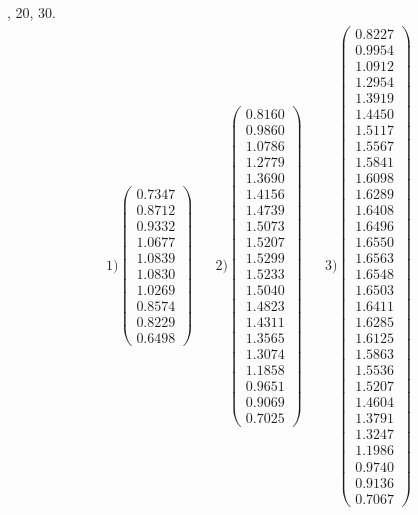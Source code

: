 \documentclass{udpreport}
\begin{document}
\begin{enumerate}
\begin {enumerate}
, 20, 30.
 	        \begin{align*}
 	             1) \left(\begin{array}{c} 0.7347\\ 0.8712\\ 0.9332\\ 1.0677\\ 1.0839\\ 1.0830\\ 1.0269\\ 0.8574\\ 0.8229\\ 0.6498 \end{array}\right) 	 &&   2) \left(\begin{array}{c} 0.8160\\ 0.9860\\ 1.0786\\ 1.2779\\ 1.3690\\ 1.4156\\ 1.4739\\ 1.5073\\ 1.5207\\ 1.5299\\ 1.5233\\ 1.5040\\ 1.4823\\ 1.4311\\ 1.3565\\ 1.3074\\ 1.1858\\ 0.9651\\ 0.9069\\ 0.7025 \end{array}\right)   &&  3) \left(\begin{array}{c} 0.8227\\ 0.9954\\ 1.0912\\ 1.2954\\ 1.3919\\ 1.4450\\ 1.5117\\ 1.5567\\ 1.5841\\ 1.6098\\ 1.6289\\ 1.6408\\ 1.6496\\ 1.6550\\ 1.6563\\ 1.6548\\ 1.6503\\ 1.6411\\ 1.6285\\ 1.6125\\ 1.5863\\ 1.5536\\ 1.5207\\ 1.4604\\ 1.3791\\ 1.3247\\ 1.1986\\ 0.9740\\ 0.9136\\ 0.7067 \end{array}\right) 

\end{align*}
\end{enumerate}
\end{enumerate}
\end{document}

